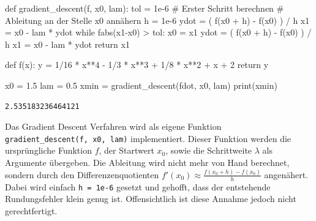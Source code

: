 \documentclass[
  a4paper,
  DIV=11]{scrreprt}
\newenvironment{Shaded}{\begin{snugshade}}{\end{snugshade}}
\newcommand{\BuiltInTok}[1]{\textcolor[rgb]{0.00,0.23,0.31}{#1}}
\newcommand{\CommentTok}[1]{\textcolor[rgb]{0.37,0.37,0.37}{#1}}
\newcommand{\ControlFlowTok}[1]{\textcolor[rgb]{0.00,0.23,0.31}{#1}}
\newcommand{\DecValTok}[1]{\textcolor[rgb]{0.68,0.00,0.00}{#1}}
\newcommand{\FloatTok}[1]{\textcolor[rgb]{0.68,0.00,0.00}{#1}}
\newcommand{\KeywordTok}[1]{\textcolor[rgb]{0.00,0.23,0.31}{#1}}
\newcommand{\NormalTok}[1]{\textcolor[rgb]{0.00,0.23,0.31}{#1}}
\newcommand{\OperatorTok}[1]{\textcolor[rgb]{0.37,0.37,0.37}{#1}}
\theoremstyle{definition}
\theoremstyle{definition}
\theoremstyle{remark}
\begin{document}
\begin{tcolorbox}
\begin{Shaded}
\begin{Highlighting}[]
\KeywordTok{def}\NormalTok{ gradient\_descent(f, x0, lam):}
\NormalTok{    tol }\OperatorTok{=} \FloatTok{1e{-}6}
    \CommentTok{\# Erster Schritt berechnen}
    \CommentTok{\# Ableitung an der Stelle x0 annähern}
\NormalTok{    h }\OperatorTok{=} \FloatTok{1e{-}6}
\NormalTok{    ydot }\OperatorTok{=}\NormalTok{ ( f(x0 }\OperatorTok{+}\NormalTok{ h) }\OperatorTok{{-}}\NormalTok{ f(x0) ) }\OperatorTok{/}\NormalTok{ h}
\NormalTok{    x1 }\OperatorTok{=}\NormalTok{ x0 }\OperatorTok{{-}}\NormalTok{ lam }\OperatorTok{*}\NormalTok{ ydot}
    \ControlFlowTok{while}\NormalTok{ fabs(x1}\OperatorTok{{-}}\NormalTok{x0) }\OperatorTok{\textgreater{}}\NormalTok{ tol:}
\NormalTok{        x0 }\OperatorTok{=}\NormalTok{ x1}
\NormalTok{        ydot }\OperatorTok{=}\NormalTok{ ( f(x0 }\OperatorTok{+}\NormalTok{ h) }\OperatorTok{{-}}\NormalTok{ f(x0) ) }\OperatorTok{/}\NormalTok{ h}
\NormalTok{        x1 }\OperatorTok{=}\NormalTok{ x0 }\OperatorTok{{-}}\NormalTok{ lam }\OperatorTok{*}\NormalTok{ ydot}
    \ControlFlowTok{return}\NormalTok{ x1}

\KeywordTok{def}\NormalTok{ f(x):}
\NormalTok{    y }\OperatorTok{=} \DecValTok{1}\OperatorTok{/}\DecValTok{16} \OperatorTok{*}\NormalTok{ x}\OperatorTok{**}\DecValTok{4} \OperatorTok{{-}} \DecValTok{1}\OperatorTok{/}\DecValTok{3} \OperatorTok{*}\NormalTok{ x}\OperatorTok{**}\DecValTok{3} \OperatorTok{+} \DecValTok{1}\OperatorTok{/}\DecValTok{8} \OperatorTok{*}\NormalTok{ x}\OperatorTok{**}\DecValTok{2} \OperatorTok{+}\NormalTok{ x }\OperatorTok{+} \DecValTok{2}
    \ControlFlowTok{return}\NormalTok{ y}

\NormalTok{x0 }\OperatorTok{=} \FloatTok{1.5}
\NormalTok{lam }\OperatorTok{=} \FloatTok{0.5}
\NormalTok{xmin }\OperatorTok{=}\NormalTok{ gradient\_descent(fdot, x0, lam)}
\BuiltInTok{print}\NormalTok{(xmin)}
\end{Highlighting}
\end{Shaded}

\begin{verbatim}
2.535183236464121
\end{verbatim}

Das Gradient Descent Verfahren wird als eigene Funktion
\texttt{gradient\_descent(f,\ x0,\ lam)} implementiert. Dieser Funktion
werden die ursprüngliche Funktion \(f\), der Startwert \(x_0\), sowie
die Schrittweite \(\lambda\) als Argumente übergeben. Die Ableitung wird
nicht mehr von Hand berechnet, sondern durch den Differenzenquotienten
\(f'(x_0) \approx \frac{f(x_0 + h) - f(x_0)}{h}\) angenähert. Dabei wird
einfach \texttt{h\ =\ 1e-6} gesetzt und gehofft, dass der entstehende
Rundungsfehler klein genug ist. Offensichtlich ist diese Annahme jedoch
nicht gerechtfertigt.

\end{tcolorbox}
\end{document}
